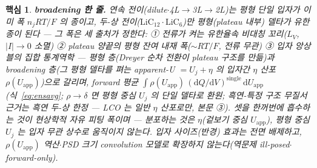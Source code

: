\documentclass[11pt,a4paper]{article}
\newtheorem*{keybox}{핵심}
\newcommand{\dd}{\mathrm{d}}
\newcommand{\app}{\mathrm{app}}
\begin{document}
\begin{keybox}
\textbf{broadening 한 줄.} 연속 전이(dilute$\cdot$4L$\to$3L$\to$2L)는 평형 단일 입자가 \emph{이미} 폭 $n_jRT/F$ 의 종이고,
두-상 전이($\mathrm{LiC_{12}}\cdot\mathrm{LiC_6}$)만 평형(plateau 내부) 델타가 유한 종이 된다 — 그 폭은 \emph{세}
출처가 정한다: ① \emph{전류가 켜는} 유한율속 비대칭 꼬리($L_V$, $|I|\!\to\!0$ 소멸) ② plateau 양끝의 \emph{평형 잔여}
내재 폭($\sim RT/F$, 전류 무관) ③ \emph{입자 앙상블}의 집합 통계역학 — 평형 층(Dreyer 순차 전환이 \emph{plateau 구조}를
만듦)과 broadening 층(그 평형 델타를 펴는 \emph{apparent-U $=U_j+\eta$} 의 입자간 $\eta$ 산포 $\rho(U_\app)$)으로 갈리며,
forward 평균 $\int\rho(U_\app)\,(\dd Q/\dd V)^\mathrm{single}\,\dd U_\app$(식~\eqref{eq:ensavg}; $\rho\!\to\!\delta$ 면
평형 중심 $U_j$ 의 단일 델타로 환원; 흑연-특정 구조 무질서 \emph{근거}는 흑연 두-상 한정 — LCO 는 일반
$\eta$ 산포로만, 본문 ③). 셋을 한꺼번에 흡수하는 것이 \emph{현상학적 자유 피팅 폭}이며 —
\emph{분포하는 것은 $\eta$(겉보기 중심 $U_\app$), 평형 중심 $U_j$ 는 입자 무관 상수로 움직이지 않는다}. \emph{입자
사이즈(반경) 효과는 전면 배제}하고, $\rho(U_\app)$ 역산$\cdot$PSD 크기 convolution 모델로 확장하지 않는다(역문제
ill-posed$\cdot$forward-only).
\end{keybox}
\end{document}
